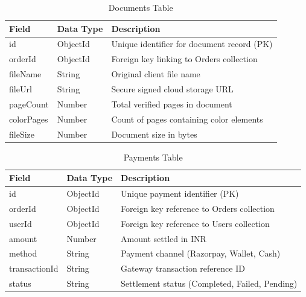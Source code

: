 \documentclass[12pt,a4paper]{report}
\begin{document}
\begin{table}[H]
\centering
\small
\caption{Documents Table}
\label{tab:documents}
\begin{tabular}{|p{1.2in}|p{1.2in}|p{3.2in}|}
\hline
\textbf{Field} & \textbf{Data Type} & \textbf{Description} \\ \hline
id & ObjectId & Unique identifier for document record (PK) \\ \hline
orderId & ObjectId & Foreign key linking to Orders collection \\ \hline
fileName & String & Original client file name \\ \hline
fileUrl & String & Secure signed cloud storage URL \\ \hline
pageCount & Number & Total verified pages in document \\ \hline
colorPages & Number & Count of pages containing color elements \\ \hline
fileSize & Number & Document size in bytes \\ \hline
\end{tabular}
\end{table}

\begin{table}[H]
\centering
\small
\caption{Payments Table}
\label{tab:payments}
\begin{tabular}{|p{1.2in}|p{1.2in}|p{3.2in}|}
\hline
\textbf{Field} & \textbf{Data Type} & \textbf{Description} \\ \hline
id & ObjectId & Unique payment identifier (PK) \\ \hline
orderId & ObjectId & Foreign key reference to Orders collection \\ \hline
userId & ObjectId & Foreign key reference to Users collection \\ \hline
amount & Number & Amount settled in INR \\ \hline
method & String & Payment channel (Razorpay, Wallet, Cash) \\ \hline
transactionId & String & Gateway transaction reference ID \\ \hline
status & String & Settlement status (Completed, Failed, Pending) \\ \hline
\end{tabular}
\end{table}
\end{document}
